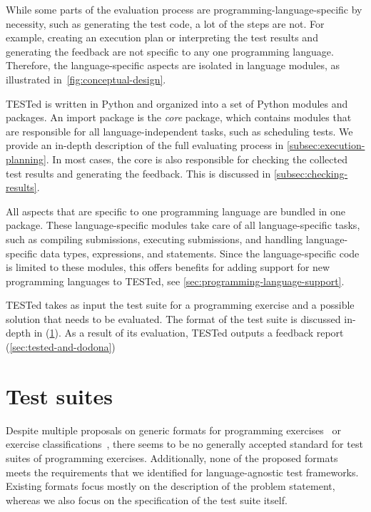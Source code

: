 \documentclass[../main]{subfiles}
\begin{document}
While some parts of the evaluation process are programming-language-specific by necessity, such as generating the test code, a lot of the steps are not.
For example, creating an execution plan or interpreting the test results and generating the feedback are not specific to any one programming language.
Therefore, the language-specific aspects are isolated in language modules, as illustrated in~\vref{fig:conceptual-design}.

\leavevmode{}%
TESTed is written in Python and organized into a set of Python modules and packages.
An import package is the \emph{core} package, which contains modules that are responsible for all language-independent tasks, such as scheduling tests.
We provide an in-depth description of the full evaluating process in \cref{subsec:execution-planning}.
In most cases, the core is also responsible for checking the collected test results and generating the feedback.
This is discussed in \cref{subsec:checking-results}.

All aspects that are specific to one programming language are bundled in one package.
These language-specific modules take care of all language-specific tasks, such as compiling submissions, executing submissions, and handling language-specific data types, expressions, and statements.
Since the language-specific code is limited to these modules, this offers benefits for adding support for new programming languages to TESTed, see \vref{sec:programming-language-support}.

TESTed takes as input the test suite for a programming exercise and a possible solution that needs to be evaluated.
The format of the test suite is discussed in-depth in (\cref{sec:test-suites}).
As a result of its evaluation, TESTed outputs a feedback report (\cref{sec:tested-and-dodona})

\section{Test suites}\label{sec:test-suites}

Despite multiple proposals on generic formats for programming exercises~\autocite{edwardsDevelopingCommonFormat2008a,paivaAnotherProgrammingExercises2020,queirosPexilProgrammingExercises2011,verhoeffProgrammingTaskPackages2008} or exercise classifications~\autocite{leOperationalizingContinuumWellDefined2013,simoesNatureProgrammingExercises2020}, there seems to be no generally accepted standard for test suites of programming exercises.
Additionally, none of the proposed formats meets the requirements that we identified for language-agnostic test frameworks.
Existing formats focus mostly on the description of the problem statement, whereas we also focus on the specification of the test suite itself.
\end{document}

